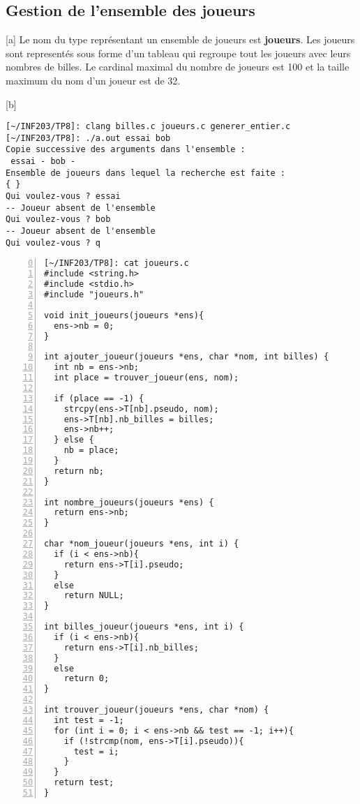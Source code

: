 \documentclass[12pt,a4paper,notitlepage,colorinlistoftodos]{article}
\begin{document}

\subsection*{Gestion de l’ensemble des joueurs}


[a]
Le nom du type représentant un ensemble de joueurs est \textbf{joueurs}.
Les joueurs sont representés sous forme d'un tableau qui regroupe tout les joueurs avec leurs nombres de billes.
Le cardinal maximal du nombre de joueurs est 100 et la taille maximum du nom d'un joueur est de 32.


[b]
\begin{lstlisting}
[~/INF203/TP8]: clang billes.c joueurs.c generer_entier.c
[~/INF203/TP8]: ./a.out essai bob
Copie successive des arguments dans l'ensemble :
 essai - bob -
Ensemble de joueurs dans lequel la recherche est faite :
{ }
Qui voulez-vous ? essai
-- Joueur absent de l'ensemble
Qui voulez-vous ? bob 
-- Joueur absent de l'ensemble
Qui voulez-vous ? q
\end{lstlisting}

\newpage
[c]
\begin{lstlisting}[numbers=left, firstnumber = 0 ]
[~/INF203/TP8]: cat joueurs.c
#include <string.h>
#include <stdio.h>
#include "joueurs.h"

void init_joueurs(joueurs *ens){
  ens->nb = 0;
}

int ajouter_joueur(joueurs *ens, char *nom, int billes) {
  int nb = ens->nb;
  int place = trouver_joueur(ens, nom);

  if (place == -1) {
    strcpy(ens->T[nb].pseudo, nom);
    ens->T[nb].nb_billes = billes;
    ens->nb++;
  } else {
    nb = place;
  }
  return nb;
}

int nombre_joueurs(joueurs *ens) {
  return ens->nb;
}

char *nom_joueur(joueurs *ens, int i) {
  if (i < ens->nb){
    return ens->T[i].pseudo;
  }
  else
    return NULL;
}

int billes_joueur(joueurs *ens, int i) {
  if (i < ens->nb){
    return ens->T[i].nb_billes;
  }
  else
    return 0;
}

int trouver_joueur(joueurs *ens, char *nom) {
  int test = -1;
  for (int i = 0; i < ens->nb && test == -1; i++){
    if (!strcmp(nom, ens->T[i].pseudo)){
      test = i;
    }
  }
  return test;
}
\end{lstlisting}
\end{document}
